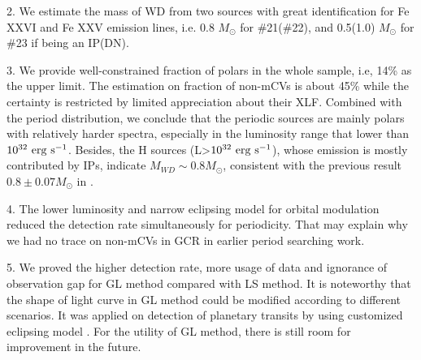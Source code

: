 \documentclass[twoside,twocolumn]{aastex63}
\begin{document}
2.  We estimate the mass of WD from two sources with great identification for Fe XXVI and Fe XXV emission lines, i.e. 0.8 $M_\odot$ for \#21(\#22), and 0.5(1.0) $M_\odot$ for \#23 if being an IP(DN). 

3. We provide well-constrained fraction of polars in the whole sample, i.e, 14\% as the upper limit. The estimation on fraction of non-mCVs is about 45\% while the certainty is restricted by limited appreciation about their XLF. Combined with the period distribution, we conclude that the periodic sources are mainly polars with relatively harder spectra, especially in the luminosity range that lower than $\rm 10^{32}~erg~s^{-1}$. Besides, the H sources (L>$\rm 10^{32}~erg~s^{-1}$), whose emission is mostly contributed by IPs, indicate  $M_{WD} \sim 0.8 M_\odot$, consistent with the previous result $0.8\pm 0.07 M_\odot$ in \citep{2018ApJ...853..182Y}.

4. The lower luminosity and narrow eclipsing model for orbital modulation reduced the detection rate simultaneously for periodicity. That may explain why we had no trace on non-mCVs in GCR in earlier period searching work.

5. We proved the higher detection rate, more usage of data and ignorance of observation gap for GL method compared with LS method. It is noteworthy that the shape of light curve in GL method could be modified according to different scenarios. It was applied on detection of planetary transits by using customized eclipsing model \citep{2002A&A...395..625A}. For the utility of GL method, there is still room for improvement in the future.
\end{document}
